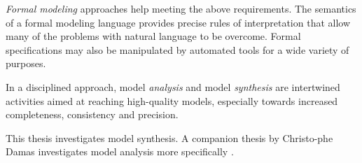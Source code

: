 \emph{Formal modeling} approaches help meeting the above requirements. The semantics of a formal modeling language provides precise rules of interpretation that allow many of the problems with natural language to be overcome. Formal specifications may also be manipulated by automated tools for a wide variety of purposes. 

In a disciplined approach, model \emph{analysis} and model \emph{synthesis} are intertwined activities aimed at reaching high-quality models, especially towards increased completeness, consistency and precision.

This thesis investigates model synthesis. A companion thesis by Christo-phe Damas investigates model analysis more specifically \cite{Damas:2011}.
